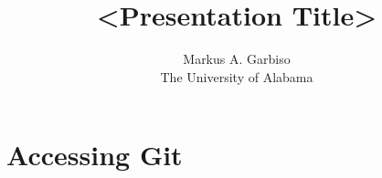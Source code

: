 \documentclass{article}
\title{<Presentation Title>} %
\author{Markus A. Garbiso \\ The University of Alabama} %
\begin{document}
\maketitle

\section{Accessing Git}
\end{document}
